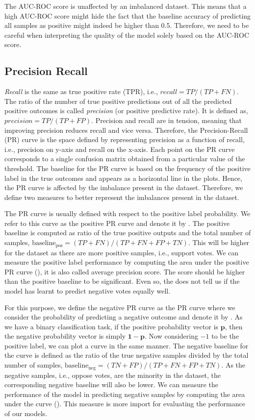 The AUC-ROC score is unaffected by an imbalanced dataset. 
This means that a high AUC-ROC score might hide the fact that the baseline accuracy of predicting all samples as positive might indeed be higher than 0.5.
Therefore, we need to be careful when interpreting the quality of the model solely based on the AUC-ROC score.

\subsection{Precision Recall}
\textit{Recall} is the same as true positive rate (TPR), i.e., $recall = TP/(TP+FN)$.
The ratio of the number of true positive predictions out of all the predicted positive outcomes is called \textit{precision} (or positive predictive rate).
It is defined as, $precision = TP/(TP+FP)$. 
Precision and recall are in tension, meaning that improving precision reduces recall and vice versa.
Therefore, the Precision-Recall (PR) curve is the space defined by representing precision as a function of recall, i.e., precision on y-axis and recall on the x-axis.
Each point on the PR curve corresponds to a single confusion matrix obtained from a particular value of the threshold.
The baseline for the PR curve is based on the frequency of the positive label in the true outcomes and appears as a horizontal line in the plots.
Hence, the PR curve is affected by the imbalance present in the dataset.
Therefore, we define two measures to better represent the imbalances present in the \wikirfa dataset.

The PR curve is usually defined with respect to the positive label probability.
We refer to this curve as the positive PR curve and denote it by \posPR.
The positive baseline is computed as ratio of the true positive outputs and the total number of samples, $\text{baseline}_{\text{pos}} = (TP+FN)/(TP+FN+FP+TN)$.
This will be higher for the \wikirfa dataset as there are more positive samples, i.e., support votes.
We can measure the positive label performance by computing the area under the positive PR curve (\aucposPR), it is also called average precision score.
The \aucposPR score should be higher than the positive baseline to be significant.
Even so, the \aucposPR does not tell us if the model has learnt to predict negative votes equally well.

For this purpose, we define the negative PR curve as the PR curve where we consider the probability of predicting a negative outcome and denote it by \negPR.
As we have a binary classification task, if the positive probability vector is $\mathbf{p}$, then the negative probability vector is simply $\mathbf{1}-\mathbf{p}$.
Now considering $-1$ to be the positive label, we can plot a \negPR curve in the same manner.
The negative baseline for the \negPR curve is defined as the ratio of the true negative samples divided by the total number of samples, $\text{baseline}_{\text{neg}} = (TN+FP)/(TP+FN+FP+TN)$.
As the negative samples, i.e., oppose votes, are the minority in the \wikirfa dataset, the corresponding negative baseline will also be lower.
We can measure the performance of the model in predicting negative samples by computing the area under the \negPR curve (\aucnegPR).
This measure is more import for evaluating the performance of our models.
